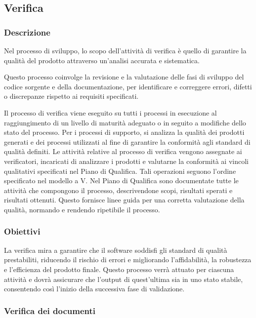 \subsection{Verifica}\label{sec:verifica}
\subsubsection{Descrizione}
Nel processo di sviluppo, lo scopo dell'attività di verifica è quello di garantire la qualità del prodotto attraverso un'analisi accurata e sistematica.

Questo processo coinvolge la revisione e la valutazione delle fasi di sviluppo del codice sorgente e della documentazione, per identificare e correggere errori, difetti o discrepanze rispetto ai requisiti specificati.

Il processo di verifica viene eseguito su tutti i processi in esecuzione al raggiungimento di un livello di maturità adeguato o in seguito a modifiche dello stato del processo. Per i processi di supporto, si analizza la qualità dei prodotti generati e dei processi utilizzati al fine di garantire la conformità agli standard di qualità definiti.
Le attività relative al processo di verifica vengono assegnate ai verificatori, incaricati di analizzare i prodotti e valutarne la conformità ai vincoli qualitativi specificati nel Piano di Qualifica. Tali operazioni seguono l'ordine specificato nel modello a V.
Nel Piano di Qualifica sono documentate tutte le attività che compongono il processo, descrivendone scopi, risultati sperati e risultati ottenuti. Questo fornisce linee guida per una corretta valutazione della qualità, normando e rendendo ripetibile il processo.

\subsubsection{Obiettivi}
La verifica mira a garantire che il software soddisfi gli standard di qualità prestabiliti, riducendo il rischio di errori e migliorando l'affidabilità, la robustezza e l'efficienza del prodotto finale.
Questo processo verrà attuato per ciascuna attività e dovrà assicurare che l'output di quest'ultima sia in uno stato stabile, consentendo così l'inizio della successiva fase di validazione.

\subsubsection{Verifica dei documenti}\label{sec:verificatori}

